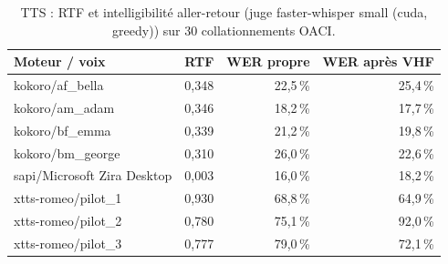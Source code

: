 \begin{table}[t]\centering\small
\caption{TTS : RTF et intelligibilité aller-retour (juge faster-whisper small (cuda, greedy)) sur 30 collationnements OACI.}
\label{tab:tts}
\begin{tabular}{lrrr}
\toprule
Moteur / voix & RTF & WER propre & WER après VHF \\
\midrule
kokoro/af\_bella & 0,348 & 22,5\,\% & 25,4\,\% \\
kokoro/am\_adam & 0,346 & 18,2\,\% & 17,7\,\% \\
kokoro/bf\_emma & 0,339 & 21,2\,\% & 19,8\,\% \\
kokoro/bm\_george & 0,310 & 26,0\,\% & 22,6\,\% \\
sapi/Microsoft Zira Desktop & 0,003 & 16,0\,\% & 18,2\,\% \\
xtts-romeo/pilot\_1 & 0,930 & 68,8\,\% & 64,9\,\% \\
xtts-romeo/pilot\_2 & 0,780 & 75,1\,\% & 92,0\,\% \\
xtts-romeo/pilot\_3 & 0,777 & 79,0\,\% & 72,1\,\% \\
\bottomrule
\end{tabular}
\end{table}
